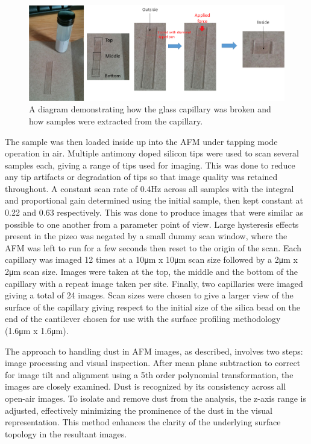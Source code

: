 \begin{figure}[h]     %
        \begin{center}
          \includegraphics[width=120mm]{chapter3/Figure8.png}
\end{center}
\caption{A diagram demonstrating how the glass capillary was broken and how samples were extracted from the capillary.}
\label{fig:figure8}                 %
\end{figure}   


The sample was then loaded inside up into the AFM under tapping mode operation in air. Multiple antimony doped silicon tips were used to scan several samples each, giving a range of tips used for imaging. This was done to reduce any tip artifacts or degradation of tips so that image quality was retained throughout. A constant scan rate of 0.4Hz across all samples with the integral and proportional gain determined using the initial sample, then kept constant at 0.22 and 0.63 respectively. This was done to produce images that were similar as possible to one another from a parameter point of view. Large hysteresis effects present in the pizeo was negated by a small dummy scan window, where the AFM was left to run for a few seconds then reset to the origin of the scan. Each capillary was imaged 12 times at a 10μm x 10μm scan size followed by a 2μm x 2μm scan size. Images were taken at the top, the middle and the bottom of the capillary with a repeat image taken per site. Finally, two capillaries were imaged giving a total of 24 images. Scan sizes were chosen to give a larger view of the surface of the capillary giving respect to the initial size of the silica bead on the end of the cantilever chosen for use with the surface profiling methodology (1.6μm x 1.6μm). 

The approach to handling dust in AFM images, as described, involves two steps: image processing and visual inspection. After mean plane subtraction to correct for image tilt and alignment using a 5th order polynomial transformation, the images are closely examined. Dust is recognized by its consistency across all open-air images. To isolate and remove dust from the analysis, the z-axis range is adjusted, effectively minimizing the prominence of the dust in the visual representation. This method enhances the clarity of the underlying surface topology in the resultant images.

